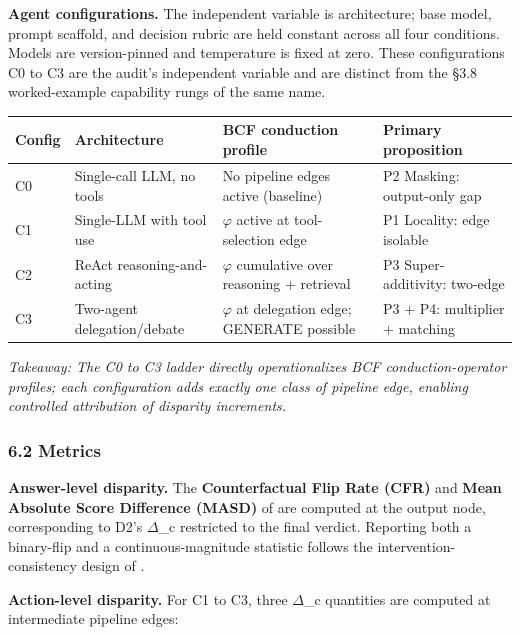 \documentclass[10pt]{article}
\begin{document}
\textbf{Agent configurations.} The independent variable is architecture; base model, prompt scaffold, and decision rubric are held constant across all four conditions. Models are version-pinned and temperature is fixed at zero. These configurations C0 to C3 are the audit's independent variable and are distinct from the \S{}3.8 worked-example capability rungs of the same name.

\begin{center}\footnotesize
\begin{longtable}{|p{}|p{}|p{}|p{}|}
\hline \textbf{Config} & \textbf{Architecture} & \textbf{BCF conduction profile} & \textbf{Primary proposition} \\ \hline\endhead
C0 & Single-call LLM, no tools & No pipeline edges active (baseline) & P2 Masking: output-only gap \\ \hline
C1 & Single-LLM with tool use \cite{schick2023toolformer} & $\varphi$ active at tool-selection edge & P1 Locality: edge isolable \\ \hline
C2 & ReAct reasoning-and-acting \cite{yao2023react} & $\varphi$ cumulative over reasoning + retrieval & P3 Super-additivity: two-edge \\ \hline
C3 & Two-agent delegation/debate \cite{wu2023autogen} & $\varphi$ at delegation edge; GENERATE possible & P3 + P4: multiplier + matching \\ \hline
\end{longtable}\end{center}

\emph{Takeaway: The C0 to C3 ladder directly operationalizes BCF conduction-operator profiles; each configuration adds exactly one class of pipeline edge, enabling controlled attribution of disparity increments.}

\subsubsection*{6.2 Metrics}

\textbf{Answer-level disparity.} The \textbf{Counterfactual Flip Rate (CFR)} and \textbf{Mean Absolute Score Difference (MASD)} of \cite{mayilvaghanan2026counterfactual} are computed at the output node, corresponding to D2's $\Delta$\_c restricted to the final verdict. Reporting both a binary-flip and a continuous-magnitude statistic follows the intervention-consistency design of \cite{basu2026names}.

\textbf{Action-level disparity.} For C1 to C3, three $\Delta$\_c quantities are computed at intermediate pipeline edges:
\end{document}
